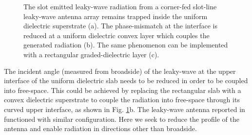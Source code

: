 \begin{figure} [t!]
\centering
\noindent
\hspace*{\fill}%
  \mbox{}
	\hfill%
	\mbox{}
		\hspace*{\fill}%
		
	\mbox{}
  
  \caption[A diagram showing how a slot emitted leaky-wave radiation from a corner-fed slot-line leaky-wave antenna array remains trapped inside the uniform dielectric superstrate. A convex dielectric domain couples the generated radiation into free-space. The same phenomenon can be implemented with a rectangular graded-dielectric superstrate. ]{The slot emitted leaky-wave radiation from a corner-fed slot-line leaky-wave antenna array remains trapped inside the uniform dielectric superstrate (a). The phase-mismatch at the interface is reduced at a uniform dielectric convex layer which couples the generated radiation (b). The same phenomenon can be implemented with a rectangular graded-dielectric layer (c).  }
\label{fig:coupling}
\end{figure}
%
The incident angle (measured from broadside) of the leaky-wave at the upper interface of the uniform dielectric slab needs to be reduced in order to be coupled into free-space. This could be achieved by replacing the rectangular slab with a convex dielectric superstrate to couple the radiation into free-space through its curved upper interface, as shown in Fig. \ref{fig:coupling}b. The leaky-wave antenna reported in \cite{Neto2005} functioned with similar configuration. Here we seek to reduce the profile of the antenna and enable radiation in directions other than broadside.

